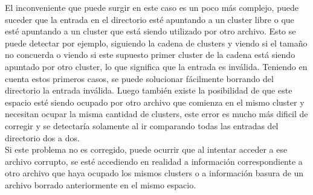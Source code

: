 \documentclass[11pt]{article}
\begin{document}
El inconveniente que puede surgir en este caso es un poco más complejo, 
puede suceder que la entrada en el directorio esté apuntando a un cluster libre
o que esté apuntando a un cluster que está siendo utilizado por otro archivo.
Esto se puede detectar por ejemplo, siguiendo la cadena de clusters y viendo si
el tamaño no concuerda o viendo si este supuesto primer cluster de la cadena está
siendo apuntado por otro cluster, lo que significa que la entrada es inválida.
Teniendo en cuenta estos primeros casos, se puede solucionar fácilmente borrando
del directorio la entrada inválida. Luego también existe la posibilidad de que 
este espacio esté siendo ocupado por otro archivo que comienza en el mismo cluster
y necesitan ocupar la misma cantidad de clusters, este error es mucho más dificil
de corregir y se detectaría solamente al ir comparando todas las entradas
del directorio dos a dos. \\

Si este problema no es corregido, puede ocurrir que al intentar acceder a ese
archivo corrupto, se esté accediendo en realidad a información correspondiente
a otro archivo que haya ocupado los mismos clusters o a información basura
de un archivo borrado anteriormente en el mismo espacio.
\end{document}
